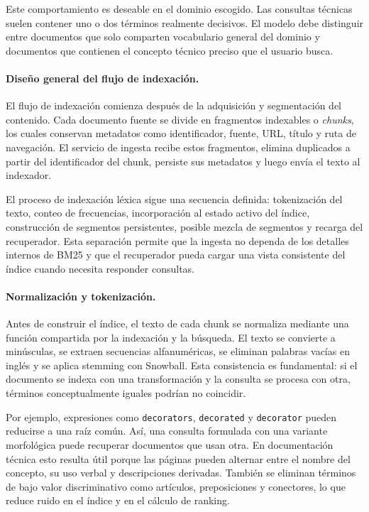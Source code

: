 \documentclass[11pt]{article}
\begin{document}
Este comportamiento es deseable en el dominio escogido. Las consultas técnicas suelen contener
uno o dos términos realmente decisivos. El modelo debe distinguir entre documentos que solo
comparten vocabulario general del dominio y documentos que contienen el concepto técnico preciso
que el usuario busca.

\paragraph{Diseño general del flujo de indexación.}
El flujo de indexación comienza después de la adquisición y segmentación del contenido. Cada
documento fuente se divide en fragmentos indexables o \emph{chunks}, los cuales conservan
metadatos como identificador, fuente, URL, título y ruta de navegación. El servicio de ingesta
recibe estos fragmentos, elimina duplicados a partir del identificador del chunk, persiste sus
metadatos y luego envía el texto al indexador.

El proceso de indexación léxica sigue una secuencia definida: tokenización del texto, conteo de
frecuencias, incorporación al estado activo del índice, construcción de segmentos persistentes,
posible mezcla de segmentos y recarga del recuperador. Esta separación permite que la ingesta no
dependa de los detalles internos de BM25 y que el recuperador pueda cargar una vista consistente
del índice cuando necesita responder consultas.

\paragraph{Normalización y tokenización.}
Antes de construir el índice, el texto de cada chunk se normaliza mediante una función compartida
por la indexación y la búsqueda. El texto se convierte a minúsculas, se extraen secuencias
alfanuméricas, se eliminan palabras vacías en inglés y se aplica stemming con Snowball. Esta
consistencia es fundamental: si el documento se indexa con una transformación y la consulta se
procesa con otra, términos conceptualmente iguales podrían no coincidir.

Por ejemplo, expresiones como \texttt{decorators}, \texttt{decorated} y \texttt{decorator}
pueden reducirse a una raíz común. Así, una consulta formulada con una variante morfológica puede
recuperar documentos que usan otra. En documentación técnica esto resulta útil porque las páginas
pueden alternar entre el nombre del concepto, su uso verbal y descripciones derivadas. También se
eliminan términos de bajo valor discriminativo como artículos, preposiciones y conectores, lo que
reduce ruido en el índice y en el cálculo de ranking.
\end{document}
